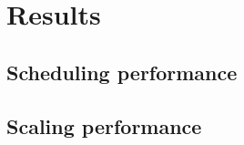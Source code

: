 \section{Results}\label{sec:result}

\subsection{Scheduling performance}\label{sec:sched}

\subsection{Scaling performance}\label{sec:scale}
